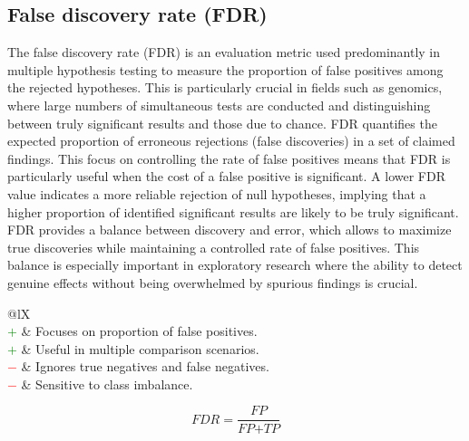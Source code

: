 \documentclass{article}
\begin{document}
\subsection[False discovery rate (FDR)]{False discovery rate (FDR) \cite{benjamini1995controlling, benjamini2001control}}

The false discovery rate (FDR) \cite{benjamini1995controlling, benjamini2001control} is an evaluation metric used predominantly in multiple hypothesis testing to measure the proportion of false positives among the rejected hypotheses. This is particularly crucial in fields such as genomics, where large numbers of simultaneous tests are conducted and distinguishing between truly significant results and those due to chance. FDR quantifies the expected proportion of erroneous rejections (false discoveries) in a set of claimed findings. This focus on controlling the rate of false positives means that FDR is particularly useful when the cost of a false positive is significant. A lower FDR value indicates a more reliable rejection of null hypotheses, implying that a higher proportion of identified significant results are likely to be truly significant. FDR provides a balance between discovery and error, which allows to maximize true discoveries while maintaining a controlled rate of false positives. This balance is especially important in exploratory research where the ability to detect genuine effects without being overwhelmed by spurious findings is crucial.

\begin{table}[H]\centering
	\begin{tabularx}{\textwidth}{@{}lX}
		 \\
		\textcolor{Green}{$+$} & Focuses on proportion of false positives. \\
		\textcolor{Green}{$+$} & Useful in multiple comparison scenarios. \\
		\textcolor{Red}{$-$}   & Ignores true negatives and false negatives. \\
		\textcolor{Red}{$-$}   & Sensitive to class imbalance.
	\end{tabularx}
\end{table}

\begin{equation}
	\textit{FDR} = \dfrac{\textit{FP}}{\textit{FP} + \textit{TP}}
%
	\label{equation:FDR}
\end{equation}
\end{document}
